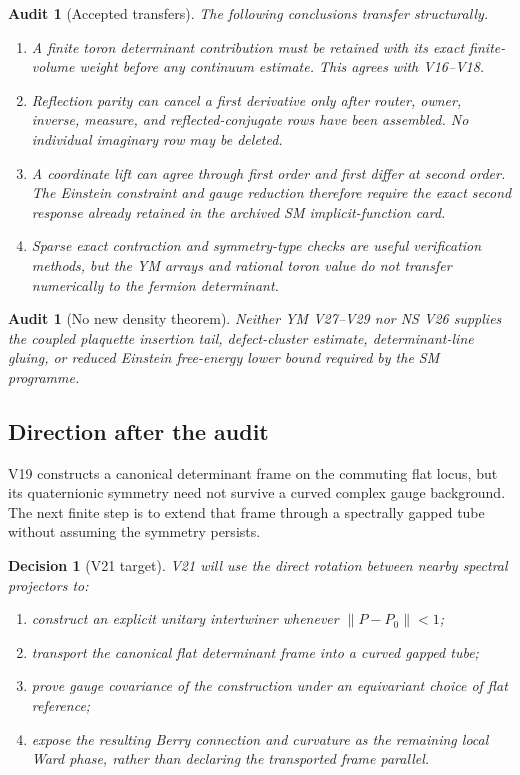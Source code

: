 \documentclass[11pt]{article}
\newtheorem{audit}[theorem]{Audit}
\newtheorem{decision}[theorem]{Decision}
\begin{document}
\begin{audit}[Accepted transfers]
\label{audit:v11v20-accepted}
The following conclusions transfer structurally.
\begin{enumerate}[label=\textnormal{(\roman*)}]
\item A finite toron determinant contribution must be retained with its
exact finite-volume weight before any continuum estimate.  This agrees
with V16--V18.
\item Reflection parity can cancel a first derivative only after router,
owner, inverse, measure, and reflected-conjugate rows have been assembled.
No individual imaginary row may be deleted.
\item A coordinate lift can agree through first order and first differ at
second order.  The Einstein constraint and gauge reduction therefore
require the exact second response already retained in the archived SM
implicit-function card.
\item Sparse exact contraction and symmetry-type checks are useful
verification methods, but the YM arrays and rational toron value do not
transfer numerically to the fermion determinant.
\end{enumerate}
\end{audit}

\begin{audit}[No new density theorem]
\label{audit:v11v20-no-density}
Neither YM V27--V29 nor NS V26 supplies the coupled plaquette insertion
tail, defect-cluster estimate, determinant-line gluing, or reduced
Einstein free-energy lower bound required by the SM programme.
\end{audit}

\subsection{Direction after the audit}

V19 constructs a canonical determinant frame on the commuting flat locus,
but its quaternionic symmetry need not survive a curved complex gauge
background.  The next finite step is to extend that frame through a
spectrally gapped tube without assuming the symmetry persists.

\begin{decision}[V21 target]
\label{dec:v11v20-direction}
V21 will use the direct rotation between nearby spectral projectors to:
\begin{enumerate}[label=\textnormal{(\alph*)}]
\item construct an explicit unitary intertwiner whenever
\(\|P-P_0\|<1\);
\item transport the canonical flat determinant frame into a curved
gapped tube;
\item prove gauge covariance of the construction under an equivariant
choice of flat reference;
\item expose the resulting Berry connection and curvature as the remaining
local Ward phase, rather than declaring the transported frame parallel.
\end{enumerate}
\end{decision}
\end{document}
